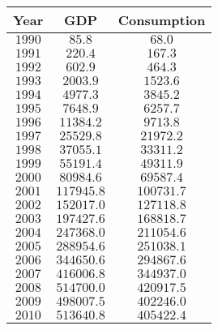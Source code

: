 \begin{figure}[ht]
\begin{center}
\begin{minipage}{1.75in}
\begin{center}
\setlength{\tabcolsep}{2pt}
\hspace{-0.5in} \begin{tabular}{ccc} \hline
Year		&\hspace{0.2in} GDP \hspace{0.2in}		&Consumption \\ \hline
$1990$ 	&$85.8$ 		&$68.0$ \\ \hline
$1991$ 	&$220.4$ 		&$167.3$ \\ \hline
$1992$ 	&$602.9$ 		&$464.3$ \\ \hline
$1993$ 	&$2003.9$ 	&$1523.6$ \\ \hline
$1994$ 	&$4977.3$	&$3845.2$ \\ \hline
$1995$ 	&$7648.9$	&$6257.7$ \\ \hline
$1996$ 	&$11384.2$ 	&$9713.8$ \\ \hline
$1997$ 	&$25529.8$	&$ 21972.2$ \\ \hline
$1998$ 	&$37055.1$ 	&$33311.2$ \\ \hline
$1999$ 	&$55191.4$	&$49311.9$ \\ \hline
$2000$ 	&$80984.6$ 	&$69587.4$  \\ \hline
$2001$ 	&$117945.8$ 	&$100731.7$ \\ \hline
$2002$ 	&$152017.0$ 	&$127118.8$ \\ \hline
$2003$	&$197427.6$ 	&$168818.7$ \\ \hline
$2004$  	&$247368.0$ 	&$211054.6$ \\ \hline
$2005$ 	&$288954.6$  	&$251038.1$ \\ \hline
$2006$  	&$344650.6$  	&$294867.6$  \\ \hline
$2007$  	&$416006.8$  	&$344937.0$ \\ \hline
$2008$  	&$514700.0$  	&$420917.5$ \\ \hline
$2009$  	&$498007.5$  	&$402246.0$ \\ \hline 
$2010$  	&$513640.8$  	&$405422.4$ \\ \hline  
\end{tabular}
\label{T:GDP_consumption}
\end{center}
\end{minipage} \hspace{0.25in}
\begin{minipage}{2.0in}
\begin{center}
\end{center}
\label{F:GDP_consumption}
\end{minipage}
\end{center}
\end{figure}


